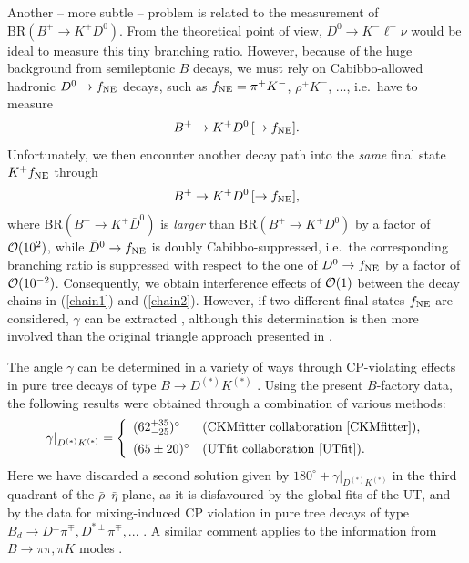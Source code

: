 \documentclass[11pt]{cernrep}
\begin{document}
Another -- more subtle -- problem is related to the measurement of
$\mbox{BR}(B^+\to K^+D^0)$. From the theoretical point of view, 
$D^0\to K^-\ell^+\nu$ would be ideal to measure this tiny 
branching ratio. However, because of the huge background from 
semileptonic $B$ decays, we must rely on Cabibbo-allowed hadronic 
$D^0\to f_{\rm NE}$ decays, such as $f_{\rm NE}=\pi^+K^-$, $\rho^+K^-$,
$\ldots$, i.e.\ have to measure 
\begin{equation}\label{chain1}
B^+\to K^+D^0 \,[\to f_{\rm NE}].
\end{equation}
Unfortunately, we then encounter another decay path into the {\it same} 
final state $K^+ f_{\rm NE}$ through 
\begin{equation}\label{chain2}
B^+\to K^+\bar D^0 \,[\to f_{\rm NE}], 
\end{equation}
where BR$(B^+\to K^+\bar D^0)$ is {\it larger} than BR$(B^+\to K^+D^0)$
by a factor of ${\cal O}(10^2)$, while $\bar D^0\to f_{\rm NE}$ is doubly 
Cabibbo-suppressed, i.e.\ the corresponding branching ratio is suppressed
with respect to the one of $D^0\to f_{\rm NE}$ by a factor of 
${\cal O}(10^{-2})$. Consequently, we obtain interference effects of 
${\cal O}(1)$ between the decay chains in (\ref{chain1}) and (\ref{chain2}). 
However, if two different final states $f_{\rm NE}$ are considered, 
$\gamma$  can be extracted \cite{ADS}, although this determination is  
then more involved than the original triangle approach presented in 
\cite{gw}. 

The angle $\gamma$ can be determined in a variety of ways
through CP-violating effects in pure
tree decays of type $B\to D^{(*)} K^{(*)}$ \cite{WG-sum}. Using the
present $B$-factory data, the following results were obtained through a
combination of various methods:
\begin{equation}\label{gam-DK}
\left.\gamma\right|_{D^{(*)} K^{(*)}} = \left\{
\begin{array}{ll}
(62^{+35}_{-25})^\circ & \mbox{(CKMfitter collaboration
    \cite{CKMfitter}),}\\[5pt]
(65\pm 20)^\circ & \mbox{(UTfit collaboration \cite{UTfit})}.
\end{array}
\right.
\end{equation}
Here we have discarded a second solution given by $180^\circ+\left.
\gamma\right|_{D^{(*)} K^{(*)}}$
in the third quadrant of the $\bar\rho$--$\bar\eta$ plane, as it is disfavoured
by the global fits of
the UT, and by the data for mixing-induced CP violation in pure tree decays
of type
$B_d\to D^{\pm}\pi^\mp, D^{\ast\pm}\pi^\mp, ...$ \cite{RF-gam-ca}. A similar
comment applies
to the information from $B\to\pi\pi, \pi K$ modes \cite{BFRS-5}. 
\end{document}
